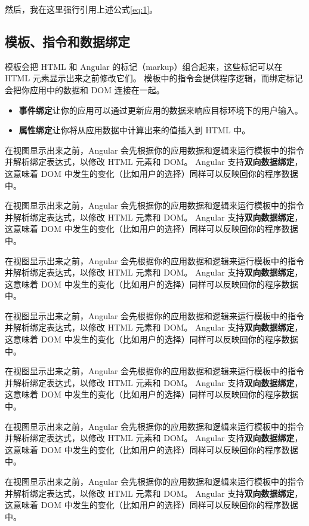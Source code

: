 \documentclass{progbookcn}
\begin{document}
然后，我在这里强行引用上述公式\ref{eq:1}。

\subsection{模板、指令和数据绑定}

模板会把 HTML 和 Angular 的标记（markup）组合起来，这些标记可以在 HTML 元素显示出来之前修改它们。 模板中的指令会提供程序逻辑，而绑定标记会把你应用中的数据和 DOM 连接在一起。

\begin{itemize}
  \item \textbf{事件绑定}让你的应用可以通过更新应用的数据来响应目标环境下的用户输入。
  \item \textbf{属性绑定}让你将从应用数据中计算出来的值插入到 HTML 中。
\end{itemize}

在视图显示出来之前，Angular 会先根据你的应用数据和逻辑来运行模板中的指令并解析绑定表达式，以修改 HTML 元素和 DOM。 Angular 支持\textbf{双向数据绑定}，这意味着 DOM 中发生的变化（比如用户的选择）同样可以反映回你的程序数据中。

在视图显示出来之前，Angular 会先根据你的应用数据和逻辑来运行模板中的指令并解析绑定表达式，以修改 HTML 元素和 DOM。 Angular 支持\textbf{双向数据绑定}，这意味着 DOM 中发生的变化（比如用户的选择）同样可以反映回你的程序数据中。

在视图显示出来之前，Angular 会先根据你的应用数据和逻辑来运行模板中的指令并解析绑定表达式，以修改 HTML 元素和 DOM。 Angular 支持\textbf{双向数据绑定}，这意味着 DOM 中发生的变化（比如用户的选择）同样可以反映回你的程序数据中。

在视图显示出来之前，Angular 会先根据你的应用数据和逻辑来运行模板中的指令并解析绑定表达式，以修改 HTML 元素和 DOM。 Angular 支持\textbf{双向数据绑定}，这意味着 DOM 中发生的变化（比如用户的选择）同样可以反映回你的程序数据中。

在视图显示出来之前，Angular 会先根据你的应用数据和逻辑来运行模板中的指令并解析绑定表达式，以修改 HTML 元素和 DOM。 Angular 支持\textbf{双向数据绑定}，这意味着 DOM 中发生的变化（比如用户的选择）同样可以反映回你的程序数据中。

在视图显示出来之前，Angular 会先根据你的应用数据和逻辑来运行模板中的指令并解析绑定表达式，以修改 HTML 元素和 DOM。 Angular 支持\textbf{双向数据绑定}，这意味着 DOM 中发生的变化（比如用户的选择）同样可以反映回你的程序数据中。

在视图显示出来之前，Angular 会先根据你的应用数据和逻辑来运行模板中的指令并解析绑定表达式，以修改 HTML 元素和 DOM。 Angular 支持\textbf{双向数据绑定}，这意味着 DOM 中发生的变化（比如用户的选择）同样可以反映回你的程序数据中。
\end{document}
